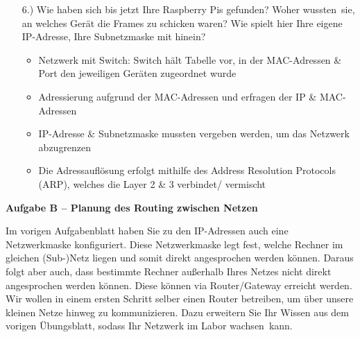 \documentclass[paper=a4,fontsize=11pt]{scrartcl}%
\numberwithin{equation}{section}
\begin{document}
\begin{itemize}
\begin{itemize}
	\end{itemize}
	\item[6.)] Wie haben sich bis jetzt Ihre Raspberry Pis gefunden? Woher \glqq wussten\grqq\ sie, an welches Gerät die Frames zu schicken waren? Wie spielt hier Ihre eigene IP-Adresse, Ihre Subnetzmaske mit hinein?
	\begin{itemize}
		\item Netzwerk mit Switch: Switch hält Tabelle vor, in der MAC-Adressen \& Port den jeweiligen Geräten zugeordnet wurde
		\item Adressierung aufgrund der MAC-Adressen und erfragen der IP \& MAC-Adressen
		\item IP-Adresse \& Subnetzmaske mussten vergeben werden, um das Netzwerk abzugrenzen
		\item Die Adressauflösung erfolgt mithilfe des Address Resolution Protocols (ARP), welches die Layer 2 \& 3 \glqq verbindet/ vermischt\grqq
	\end{itemize}
\end{itemize}
\begin{center}
\Large{\textbf{Aufgabe B -- Planung des Routing zwischen Netzen}}
\end{center}
\vskip0.25in
Im vorigen Aufgabenblatt haben Sie zu den IP-Adressen auch eine Netzwerkmaske konfiguriert. Diese Netzwerkmaske legt fest, welche Rechner im gleichen (Sub-)Netz liegen und somit direkt angesprochen werden können. Daraus folgt aber auch, dass bestimmte Rechner außerhalb Ihres Netzes nicht direkt angesprochen werden können. Diese können via Router/Gateway erreicht werden.\\
Wir wollen in einem ersten Schritt selber einen Router betreiben, um über unsere kleinen Netze hinweg zu kommunizieren. Dazu erweitern Sie Ihr Wissen aus dem vorigen Übungsblatt, sodass Ihr Netzwerk im Labor \glqq wachsen\grqq\ kann.
\end{document}
